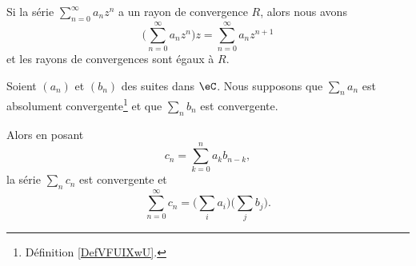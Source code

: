 \begin{lemma}        \label{LEMooLPBCooRWuvJB}
	Si la série \( \sum_{n=0}^{\infty}a_nz^n\) a un rayon de convergence \( R\), alors nous avons
	\begin{equation}
		\big( \sum_{n=0}^{\infty}a_nz^n \big)z=\sum_{n=0}^{\infty}a_nz^{n+1}
	\end{equation}
	et les rayons de convergences sont égaux à \( R\).
\end{lemma}

\begin{proposition}       \label{PROPooPKGEooZKyxwo}
	Soient \( (a_n)\) et \( (b_n)\) des suites dans \( \eC\). Nous supposons que \( \sum_na_n\) est absolument convergente\footnote{Définition \ref{DefVFUIXwU}.} et que \( \sum_nb_n\) est convergente.

	Alors en posant
	\begin{equation}
		c_n=\sum_{k=0}^na_kb_{n-k},
	\end{equation}
	la série \( \sum_nc_n\) est convergente et
	\begin{equation}
		\sum_{n=0}^{\infty}c_n=\big( \sum_ia_i \big)\big( \sum_j b_j \big).
	\end{equation}
\end{proposition}

